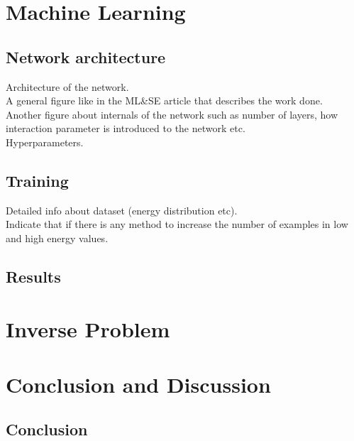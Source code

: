 \documentclass[a4paper,times,12pt]{article}
\begin{document}
%		


\section{Machine Learning}
\subsection{Network architecture}
\noindent Architecture of the network.\\
    A general figure like in the ML\&SE article that describes the work done.\\
    Another figure about internals of the network such as number of layers, how interaction parameter is introduced to the network etc.\\
    Hyperparameters.\\
\subsection{Training}
\noindent    Detailed info about dataset (energy distribution etc).\\
    Indicate that if there is any method to increase the number of examples in low and high energy values.

\subsection{Results}

\section{Inverse Problem}

\clearpage
\section{Conclusion and Discussion}
\subsection{Conclusion}
\end{document}
